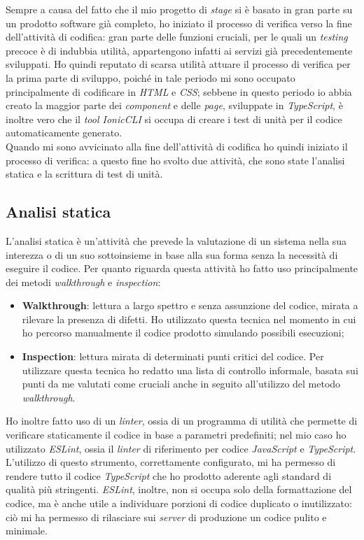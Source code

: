 Sempre a causa del fatto che il mio progetto di \textit{stage} si è basato in gran parte su un prodotto software già completo, ho iniziato il processo di verifica verso la fine dell'attività di codifica: gran parte delle funzioni cruciali, per le quali un \textit{testing} precoce è di indubbia utilità, appartengono infatti ai servizi già precedentemente sviluppati. Ho quindi reputato di scarsa utilità attuare il processo di verifica per la prima parte di sviluppo, poiché in tale periodo mi sono occupato principalmente di codificare in \textit{HTML} e \textit{CSS}; sebbene in questo periodo io abbia creato la maggior parte dei \textit{component} e delle \textit{page}, sviluppate in \textit{TypeScript}, è inoltre vero che il \textit{tool IonicCLI} si occupa di creare i test di unità per il codice automaticamente generato. \\
Quando mi sono avvicinato alla fine dell'attività di codifica ho quindi iniziato il processo di verifica: a questo fine ho svolto due attività, che sono state l'analisi statica e la scrittura di test di unità.


\subsection{Analisi statica}

L'analisi statica è un'attività che prevede la valutazione di un sistema nella sua interezza o di un suo sottoinsieme in base alla sua forma senza la necessità di eseguire il codice. Per quanto riguarda questa attività ho fatto uso principalmente dei metodi \textit{walkthrough} e \textit{inspection}:

\begin{itemize}
  \item \textbf{Walkthrough}: lettura a largo spettro e senza assunzione del codice, mirata a rilevare la presenza di difetti. Ho utilizzato questa tecnica nel momento in cui ho percorso manualmente il codice prodotto simulando possibili esecuzioni;
  \item \textbf{Inspection}: lettura mirata di determinati punti critici del codice. Per utilizzare questa tecnica ho redatto una lista di controllo informale, basata sui punti da me valutati come cruciali anche in seguito all'utilizzo del metodo \textit{walkthrough}.
\end{itemize}

Ho inoltre fatto uso di un \textit{linter}, ossia di un programma di utilità che permette di verificare staticamente il codice in base a parametri predefiniti; nel mio caso ho utilizzato \textit{ESLint}, ossia il \textit{linter} di riferimento per codice \textit{JavaScript} e \textit{TypeScript}. L'utilizzo di questo strumento, correttamente configurato, mi ha permesso di rendere tutto il codice \textit{TypeScript} che ho prodotto aderente agli standard di qualità più stringenti. \textit{ESLint}, inoltre, non si occupa solo della formattazione del codice, ma è anche utile a individuare porzioni di codice duplicato o inutilizzato: ciò mi ha permesso di rilasciare sui \textit{server} di produzione un codice pulito e minimale. \\

